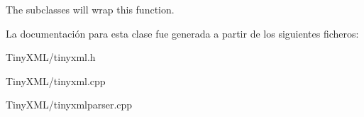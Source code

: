 The subclasses will wrap this function. 

La documentación para esta clase fue generada a partir de los siguientes ficheros\-:\begin{DoxyCompactItemize}
\item 
Tiny\-X\-M\-L/tinyxml.\-h\item 
Tiny\-X\-M\-L/tinyxml.\-cpp\item 
Tiny\-X\-M\-L/tinyxmlparser.\-cpp\end{DoxyCompactItemize}
